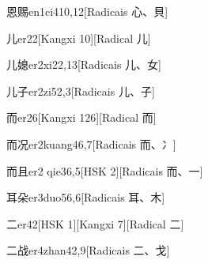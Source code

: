 \begin{entry}{恩赐}{en1ci4}{10,12}[Radicais ⼼、⾙]
\end{entry}

\begin{entry}{儿}{er2}{2}[Kangxi 10][Radical ⼉]
\end{entry}

\begin{entry}{儿媳}{er2xi2}{2,13}[Radicais ⼉、⼥]
\end{entry}

\begin{entry}{儿子}{er2zi5}{2,3}[Radicais ⼉、⼦]
\end{entry}

\begin{entry}{而}{er2}{6}[Kangxi 126][Radical ⽽]
\end{entry}

\begin{entry}{而况}{er2kuang4}{6,7}[Radicais ⽽、⼎]
\end{entry}

\begin{entry}{而且}{er2 qie3}{6,5}[HSK 2][Radicais ⽽、⼀]
\end{entry}

\begin{entry}{耳朵}{er3duo5}{6,6}[Radicais ⽿、⽊]
\end{entry}

\begin{entry}{二}{er4}{2}[HSK 1][Kangxi 7][Radical ⼆]
\end{entry}

\begin{entry}{二战}{er4zhan4}{2,9}[Radicais ⼆、⼽]
\end{entry}


